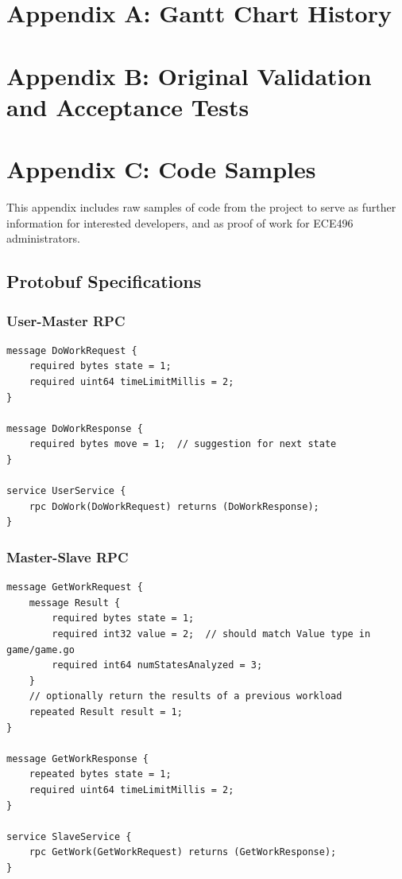 \documentclass[pdftex,12pt,a4paper]{article}
\begin{document}
%
%
%
\pagebreak
\section{Appendix A: Gantt Chart History}

%
%
%
\pagebreak
\section{Appendix B: Original Validation and Acceptance Tests}

%
%
\pagebreak
\section{Appendix C: Code Samples}

This appendix includes raw samples of code from the project to serve as further information for interested developers, and as proof of work for ECE496 administrators.

\subsection{Protobuf Specifications}\label{sec:protobuf-sample}

\subsubsection*{User-Master RPC}
\begin{lstlisting}
message DoWorkRequest {
    required bytes state = 1;
    required uint64 timeLimitMillis = 2;
}

message DoWorkResponse {
    required bytes move = 1;  // suggestion for next state
}

service UserService {
    rpc DoWork(DoWorkRequest) returns (DoWorkResponse);
}
\end{lstlisting}

\subsubsection*{Master-Slave RPC}
\begin{lstlisting}
message GetWorkRequest {
    message Result {
        required bytes state = 1;
        required int32 value = 2;  // should match Value type in game/game.go
        required int64 numStatesAnalyzed = 3;
    }
    // optionally return the results of a previous workload
    repeated Result result = 1;
}

message GetWorkResponse {
    repeated bytes state = 1;
    required uint64 timeLimitMillis = 2;
}

service SlaveService {
    rpc GetWork(GetWorkRequest) returns (GetWorkResponse);
}
\end{lstlisting}
\end{document}
